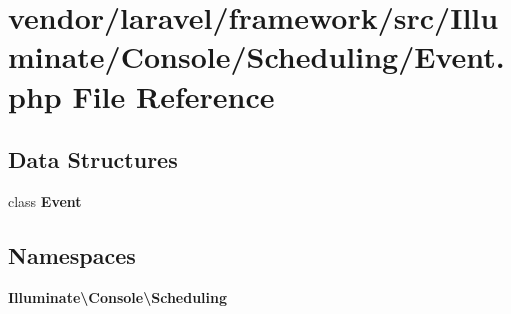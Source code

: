 \section{vendor/laravel/framework/src/\+Illuminate/\+Console/\+Scheduling/\+Event.php File Reference}
\label{vendor_2laravel_2framework_2src_2_illuminate_2_console_2_scheduling_2_event_8php}
\subsection*{Data Structures}
\begin{DoxyCompactItemize}
\item 
class {\bf Event}
\end{DoxyCompactItemize}
\subsection*{Namespaces}
\begin{DoxyCompactItemize}
\item 
 {\bf Illuminate\textbackslash{}\+Console\textbackslash{}\+Scheduling}
\end{DoxyCompactItemize}
